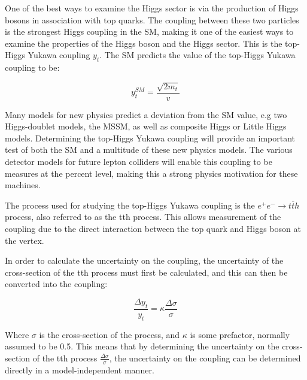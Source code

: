 One of the best ways to examine the Higgs sector is via the production of Higgs bosons in association with top quarks. The coupling between these two particles is the strongest Higgs coupling in the \acrshort{SM}, making it one of the easiest ways to examine the properties of the Higgs boson and the Higgs sector. This is the top-Higgs Yukawa coupling $y_t$. The \acrlong{SM} predicts the value of the top-Higgs Yukawa coupling to be:

\begin{equation}
	y_t^{SM} = \frac{\sqrt{2m_t}}{v}
\label{eq:yukawacoupling-sm-value}
\end{equation}

Many models for new physics predict a deviation from the \acrshort{SM} value, e.g two Higgs-doublet models, the \acrfull{MSSM}, as well as composite Higgs or Little Higgs models. Determining the top-Higgs Yukawa coupling will provide an important test of both the \acrlong{SM} and a multitude of these new physics models. The various detector models for future lepton colliders will enable this coupling to be measures at the percent level, making this a strong physics motivation for these machines.

The process used for studying the top-Higgs Yukawa coupling is the $e^+ e^- \rightarrow t\overline{t}h$ process, also referred to as the tth process. This allows measurement of the coupling due to the direct interaction between the top quark and Higgs boson at the vertex.

In order to calculate the uncertainty on the coupling, the uncertainty of the cross-section of the tth process must first be calculated, and this can then be converted into the coupling:

\begin{equation}
	\frac{\Delta y_t}{y_t} = \kappa \frac{\Delta \sigma}{\sigma}
\label{eq:crosssection-to-yukawa}
\end{equation}

Where $\sigma$ is the cross-section of the process, and $\kappa$ is some prefactor, normally assumed to be 0.5. This means that by determining the uncertainty on the cross-section of the tth process $\frac{\Delta \sigma}{\sigma}$, the uncertainty on the coupling can be determined directly in a model-independent manner. 

%

